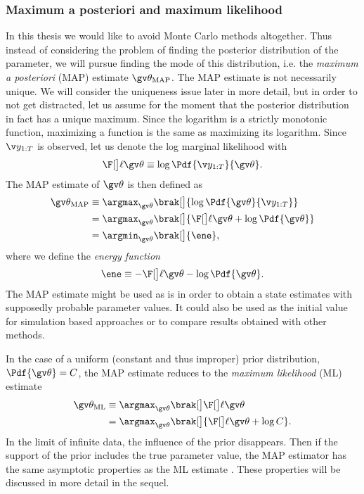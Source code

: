 \subsubsection{Maximum a posteriori and maximum likelihood}

In this thesis we would like to avoid Monte Carlo methods altogether. Thus instead
of considering the problem of finding the posterior distribution of the parameter,
we will pursue finding the mode of this distribution, i.e. the \emph{maximum a posteriori} (MAP) estimate
$\Th_{\text{MAP}}$. The MAP estimate is not necessarily unique. 
We will consider the uniqueness issue later in more detail, but in order
to not get distracted, let us assume for the moment that the posterior distribution in fact
has a unique maximum. Since the logarithm is a strictly monotonic function, maximizing a function
is the same as maximizing its logarithm. 
Since $\Y$ is observed, let us denote 
the log marginal likelihood with 
\begin{align*}
	\lLH \equiv \log \Pdf{\Y}{\Th}.
\end{align*}
The MAP estimate of $\Th$ is then defined as 
\begin{align}
	\Th_{\text{MAP}} &\equiv \argmax_{\Th}\brak[\big]{ \log\Pdf{\Th}{\Y}} \nonumber\\ 
	&=\argmax_{\Th}\brak[\big]{\lLH + \log\Pdf{\Th}} \nonumber\\
	&=\argmin_{\Th}\brak[\big]{\ene},
	\label{eq:MAP}
\end{align}
where we define the \emph{energy function}
\parencite{Mbalawataa}
\begin{align}
	\ene \equiv -\lLH - \log\Pdf{\Th}.
	\label{eq:ene}
\end{align}
The MAP estimate might be used as is in order to obtain a state estimates
with supposedly probable parameter values. It could also be used as the initial
value for simulation based approaches or to compare results obtained with other
methods.

In the case of a uniform (constant and thus improper)
prior distribution, $\Pdf{\Th}=C$, the MAP estimate reduces to the
\emph{maximum likelihood} (ML) estimate
\begin{align}
	\Th_{\text{ML}} &\equiv \argmax_{\Th}\brak[\big]\lLH\label{eq:ML} \\
	&= \argmax_{\Th}\brak[\big]{\lLH+\log C} \nonumber.
\end{align}
In the limit of infinite data, the influence of the prior
disappears. Then if the support of the prior includes the true
parameter value, the MAP estimator has the same asymptotic properties
as the ML estimate \parencite{Cappe2005}. These properties will be discussed in more
detail in the sequel. 


